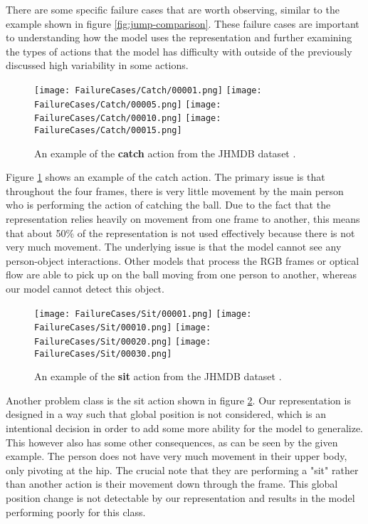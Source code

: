 There are some specific failure cases that are worth observing, similar to the example shown in figure \ref{fig:jump-comparison}. These failure cases are important to understanding how the model uses the representation and further examining the types of actions that the model has difficulty with outside of the previously discussed high variability in some actions.

\begin{figure}[ht]
	\texttt{[image: FailureCases/Catch/00001.png]}
	\texttt{[image: FailureCases/Catch/00005.png]}
	\texttt{[image: FailureCases/Catch/00010.png]}
	\texttt{[image: FailureCases/Catch/00015.png]}
	\centering
	\caption{An example of the \textbf{catch} action from the JHMDB dataset \cite{JHMDB}.}
	\label{fig:catch-action}
\end{figure}

Figure \ref{fig:catch-action} shows an example of the catch action. The primary issue is that throughout the four frames, there is very little movement by the main person who is performing the action of catching the ball. Due to the fact that the representation relies heavily on movement from one frame to another, this means that about 50\% of the representation is not used effectively because there is not very much movement. The underlying issue is that the model cannot see any person-object interactions. Other models that process the RGB frames or optical flow are able to pick up on the ball moving from one person to another, whereas our model cannot detect this object.

\begin{figure}[ht]
	\texttt{[image: FailureCases/Sit/00001.png]}
	\texttt{[image: FailureCases/Sit/00010.png]}
	\texttt{[image: FailureCases/Sit/00020.png]}
	\texttt{[image: FailureCases/Sit/00030.png]}
	\centering
	\caption{An example of the \textbf{sit} action from the JHMDB dataset \cite{JHMDB}.}
	\label{fig:sit-action}
\end{figure}

Another problem class is the sit action shown in figure \ref{fig:sit-action}. Our representation is designed in a way such that global position is not considered, which is an intentional decision in order to add some more ability for the model to generalize. This however also has some other consequences, as can be seen by the given example. The person does not have very much movement in their upper body, only pivoting at the hip. The crucial note that they are performing a "sit" rather than another action is their movement down through the frame. This global position change is not detectable by our representation and results in the model performing poorly for this class.

